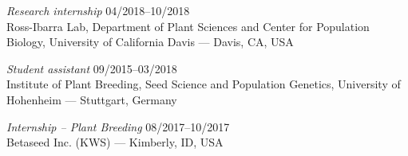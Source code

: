 \documentclass[margin,10pt,a4paper]{res}
\begin{document}
\begin{resume}
{\sl Research internship} \hfill 04/2018--10/2018 \\
Ross-Ibarra Lab, Department of Plant Sciences and Center for Population Biology, University of California Davis --- Davis, CA, USA



{\sl Student assistant} \hfill 09/2015--03/2018 \\
Institute of Plant Breeding, Seed Science and Population Genetics, University of Hohenheim --- Stuttgart, Germany



{\sl Internship -- Plant Breeding} \hfill 08/2017--10/2017 \\
Betaseed Inc. (KWS) --- Kimberly, ID, USA



\end{resume}
\end{document}
